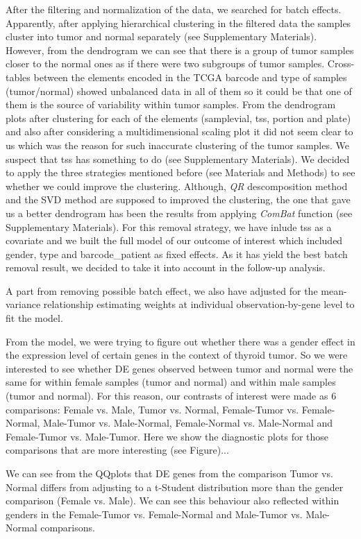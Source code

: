 \documentclass[9pt,twocolumn,twoside]{gsajnl}
\begin{document}
After the filtering and normalization of the data, we searched for batch effects. Apparently, after applying hierarchical clustering in the filtered data the samples cluster into tumor and normal separately (see Supplementary Materials). However, from the dendrogram we can see that there is a group of tumor samples closer to the normal ones as if there were two subgroups of tumor samples. Cross-tables between the elements encoded in the TCGA barcode and type of samples (tumor/normal) showed unbalanced data in all of them so it could be that one of them is the source of variability within tumor samples. From the dendrogram plots after clustering for each of the elements (samplevial, tss, portion and plate) and also after considering a multidimensional scaling plot it did not seem clear to us which was the reason for such inaccurate clustering of the tumor samples. We suspect that tss has something to do (see Supplementary Materials). We decided to apply the three strategies mentioned before (see Materials and Methods) to see whether we could improve the clustering. Although, \textit{QR} descomposition method and the SVD method are supposed to improved the clustering, the one that gave us a better dendrogram has been the results from applying \textit{ComBat} function (see Supplementary Materials). For this removal strategy, we have inlude tss as a covariate and we built the full model of our outcome of interest which included gender, type and barcode\_patient as fixed effects. As it has yield the best batch removal result, we decided to take it into account in the follow-up analysis.

A part from removing possible batch effect, we also have adjusted for the mean-variance relationship estimating weights at individual observation-by-gene level to fit the model.  

From the model, we were trying to figure out whether there was a gender effect in the expression level of certain genes in the context of thyroid tumor. So we were interested to see whether DE genes observed between tumor and normal were the same for within female samples (tumor  and normal) and within male samples (tumor and normal). For this reason, our contrasts of interest were made as 6 comparisons: Female vs. Male, Tumor vs. Normal, Female-Tumor vs. Female-Normal,  Male-Tumor vs. Male-Normal, Female-Normal vs. Male-Normal and Female-Tumor vs. Male-Tumor. Here we show the diagnostic plots for those comparisons that are more interesting (see Figure)...

We can see from the QQplots that DE genes from the comparison Tumor vs. Normal differs from adjusting to a t-Student distribution more than the gender comparison (Female vs. Male). We can see this behaviour also reflected within genders in the Female-Tumor vs. Female-Normal and Male-Tumor vs. Male-Normal comparisons. 
\end{document}
